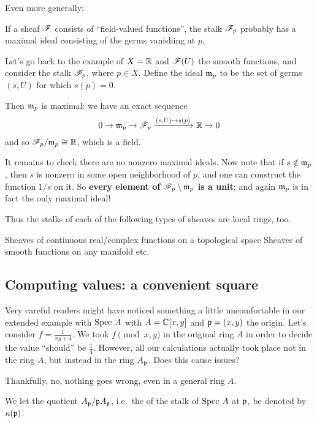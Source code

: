 Even more generally:
\begin{moral}
	If a sheaf $\mathscr F$ consists of ``field-valued functions'',
	the stalk $\mathscr F_p$ probably has a maximal ideal
	consisting of the germs vanishing at $p$.
\end{moral}

\begin{example}
Let's go back to the example of $X = \mathbb R$ and $\mathscr F(U)$ the smooth functions,
and consider the stalk $\mathscr F_{p}$, where $p \in X$.
Define the ideal $\mathfrak m_p$ to be the set of germs $(s,U)$ for which $s(p) = 0$.

Then $\mathfrak m_p$ is maximal: we have an exact sequence
\[ 0 \to \mathfrak m_p \to \mathscr F_p \xrightarrow{(s,U) \mapsto s(p)} \mathbb R \to 0 \]
and so $\mathscr F_p / \mathfrak m_p \cong \mathbb R$, which is a field.

It remains to check there are no nonzero maximal ideals.
Now note that if $s \notin \mathfrak m_p$,
then $s$ is nonzero in some open neighborhood of $p$,
and one can construct the function $1/s$ on it.
So \textbf{every element of $\mathscr F_p \setminus \mathfrak m_p$ is a unit};
and again $\mathfrak m_p$ is in fact the only maximal ideal!

Thus the stalks of each of the following types of sheaves
are local rings, too.
\begin{itemize}
	\ii Sheaves of continuous real/complex functions on a topological space
	\ii Sheaves of smooth functions on any manifold
	\ii etc.
\end{itemize}
\end{example}

\subsection{Computing values: a convenient square}
Very careful readers might have noticed something
a little uncomfortable in our extended example with $\text{Spec } A$
with $A = \mathbb C[x,y]$ and $\mathfrak p = (x,y)$ the origin.
Let's consider $f = \frac{1}{xy+4}$.
We took $f \pmod{x,y}$ in the original ring $A$ in order
to decide the value ``should'' be $\frac14$.
However, all our calculations actually
took place not in the ring $A$, but instead in the ring $A_\mathfrak p$.
Does this cause issues?

Thankfully, no, nothing goes wrong, even in a general ring $A$.

\begin{definition}
	We let the quotient $A_\mathfrak p / \mathfrak p A_\mathfrak p$,
	i.e.\ the  of the stalk of $\text{Spec } A$ at $\mathfrak p$,
	be denoted by $\kappa(\mathfrak p)$.
\end{definition}

